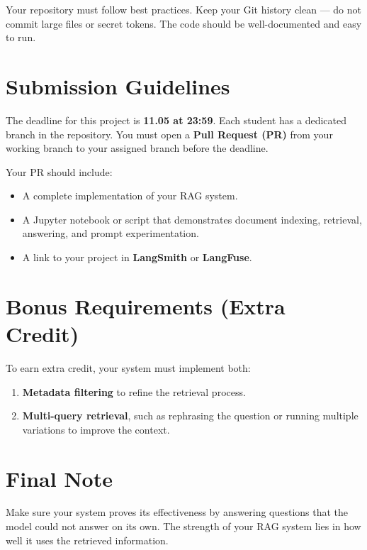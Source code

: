 \documentclass[a4paper,12pt]{article}
\begin{document}
Your repository must follow best practices. Keep your Git history clean — do not commit large files or secret tokens. The code should be well-documented and easy to run.

\section*{Submission Guidelines}

The deadline for this project is \textbf{11.05 at 23:59}. Each student has a dedicated branch in the repository. You must open a \textbf{Pull Request (PR)} from your working branch to your assigned branch before the deadline.

Your PR should include:
\begin{itemize}[noitemsep]
  \item A complete implementation of your RAG system.
  \item A Jupyter notebook or script that demonstrates document indexing, retrieval, answering, and prompt experimentation.
  \item A link to your project in \textbf{LangSmith} or \textbf{LangFuse}.
\end{itemize}

\section*{Bonus Requirements (Extra Credit)}

To earn extra credit, your system must implement both:
\begin{enumerate}[label=\arabic*.]
  \item \textbf{Metadata filtering} to refine the retrieval process.
  \item \textbf{Multi-query retrieval}, such as rephrasing the question or running multiple variations to improve the context.
\end{enumerate}

\section*{Final Note}

Make sure your system proves its effectiveness by answering questions that the model could not answer on its own. The strength of your RAG system lies in how well it uses the retrieved information.
\end{document}
